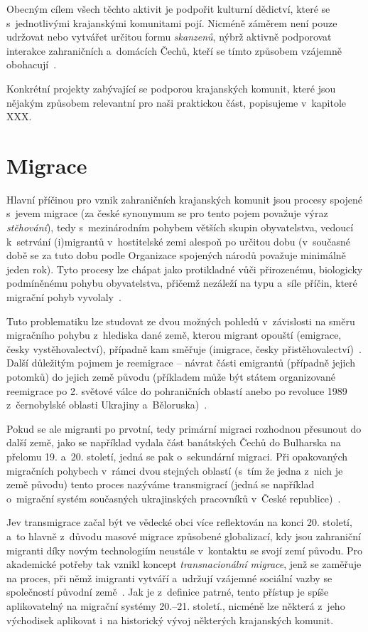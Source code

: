Obecným cílem všech těchto aktivit je podpořit kulturní dědictví, které se s~jednotlivými krajanskými komunitami pojí. Nicméně záměrem není pouze udržovat nebo vytvářet určitou formu \emph{skanzenů}, nýbrž aktivně podporovat interakce zahraničních a~domácích Čechů, kteří se tímto způsobem vzájemně obohacují~\parencite{Broucek2009}.

Konkrétní projekty zabývající se podporou krajanských komunit, které jsou nějakým způsobem relevantní pro naši praktickou část, popisujeme v~kapitole XXX.

\hypertarget{migrace}{%
\section{Migrace}\label{migrace}}

Hlavní příčinou pro vznik zahraničních krajanských komunit jsou procesy spojené s~jevem migrace (za české synonymum se pro tento pojem považuje výraz \emph{stěhování}), tedy s~mezinárodním pohybem větších skupin obyvatelstva, vedoucí k~setrvání (i)migrantů v~hostitelské zemi alespoň po určitou dobu (v~současné době se za tuto dobu podle Organizace spojených národů považuje minimálně jeden rok). Tyto procesy lze chápat jako protikladné vůči přirozenému, biologicky podmíněnému pohybu obyvatelstva, přičemž nezáleží na typu a~síle příčin, které migrační pohyb vyvolaly~\parencite{Nespor2005}.

Tuto problematiku lze studovat ze dvou možných pohledů v~závislosti na směru migračního pohybu z~hlediska dané země, kterou migrant opouští (emigrace, česky vystěhovalectví), případně kam směřuje (imigrace, česky přistěhovalectví)~\parencite{Fialova2017b}. Další důležitým pojmem je reemigrace -- návrat části emigrantů (případně jejich potomků) do jejich země původu (příkladem může být státem organizované reemigrace po 2. světové válce do pohraničních oblastí anebo po revoluce 1989 z~černobylské oblasti Ukrajiny a~Běloruska)~\parencite{Nespor2005}.

Pokud se ale migranti po prvotní, tedy primární migraci rozhodnou přesunout do další země, jako se například vydala část banátských Čechů do Bulharska na přelomu 19. a~20. století, jedná se pak o~sekundární migraci. Při opakovaných migračních pohybech v~rámci dvou stejných oblastí (s~tím že jedna z~nich je země původu) tento proces nazýváme transmigrací (jedná se například o~migrační systém současných ukrajinských pracovníků v~České republice)~\parencite{Nespor2005}.

Jev transmigrace začal být ve vědecké obci více reflektován na konci 20. století, a~to hlavně z~důvodu masové migrace způsobené globalizací, kdy jsou zahraniční migranti díky novým technologiím neustále v~kontaktu se svojí zemí původu. Pro akademické potřeby tak vznikl koncept \emph{transnacionální migrace}, jenž se zaměřuje na proces, při němž imigranti vytváří a~udržují vzájemné sociální vazby se společností původní země~\parencite{Kralova2013}. Jak je z~definice patrné, tento přístup je spíše aplikovatelný na migrační systémy 20.--21. století., nicméně lze některá z~jeho východisek aplikovat i~na historický vývoj některých krajanských komunit.

